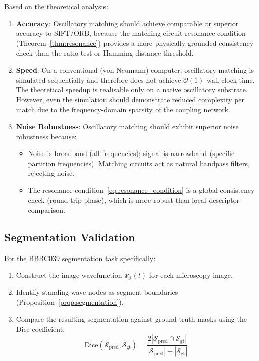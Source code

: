 \documentclass[11pt,twocolumn,a4paper]{article}
\newcommand{\BigO}{\mathcal{O}}
\begin{document}
Based on the theoretical analysis:
\begin{enumerate}[label=(\roman*)]
    \item \textbf{Accuracy}: Oscillatory matching should achieve comparable or superior accuracy to SIFT/ORB, because the matching circuit resonance condition (Theorem~\ref{thm:resonance}) provides a more physically grounded consistency check than the ratio test or Hamming distance threshold.

    \item \textbf{Speed}: On a conventional (von Neumann) computer, oscillatory matching is simulated sequentially and therefore does not achieve $\BigO(1)$ wall-clock time. The theoretical speedup is realisable only on a native oscillatory substrate. However, even the simulation should demonstrate reduced complexity per match due to the frequency-domain sparsity of the coupling network.

    \item \textbf{Noise Robustness}: Oscillatory matching should exhibit superior noise robustness because:
    \begin{itemize}[leftmargin=2em]
        \item Noise is broadband (all frequencies); signal is narrowband (specific partition frequencies). Matching circuits act as natural bandpass filters, rejecting noise.
        \item The resonance condition~\eqref{eq:resonance_condition} is a global consistency check (round-trip phase), which is more robust than local descriptor comparison.
    \end{itemize}
\end{enumerate}

\subsection{Segmentation Validation}

For the BBBC039 segmentation task specifically:
\begin{enumerate}[label=(\roman*)]
    \item Construct the image wavefunction $\Psi_{\mathcal{I}}(t)$ for each microscopy image.
    \item Identify standing wave nodes as segment boundaries (Proposition~\ref{prop:segmentation}).
    \item Compare the resulting segmentation against ground-truth masks using the Dice coefficient:
    \begin{equation}
        \text{Dice}(\mathcal{S}_{\text{pred}}, \mathcal{S}_{\text{gt}}) = \frac{2|\mathcal{S}_{\text{pred}} \cap \mathcal{S}_{\text{gt}}|}{|\mathcal{S}_{\text{pred}}| + |\mathcal{S}_{\text{gt}}|}.
        \label{eq:dice}
    \end{equation}
\end{enumerate}
\end{document}
